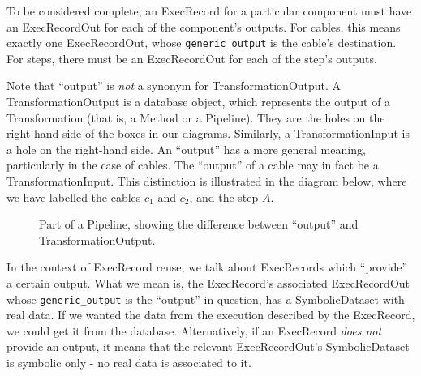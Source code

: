 \documentclass[12pt]{article}
\newcommand{\code}[1]{\texttt{#1}}
\begin{document}
To be considered complete, an ExecRecord for a particular component must have
an ExecRecordOut for each of the component's outputs. For cables, this means
exactly one ExecRecordOut, whose \code{generic\_output} is the cable's
destination. For steps, there must be an ExecRecordOut for each of the step's
outputs.

Note that ``output'' is \emph{not} a synonym for TransformationOutput. A
TransformationOutput is a database object, which represents the output of a
Transformation (that is, a Method or a Pipeline). They are the holes on the
right-hand side of the boxes in our diagrams. Similarly, a TransformationInput
is a hole on the right-hand side. An ``output'' has a more general meaning,
particularly in the case of cables. The ``output'' of a cable may in fact be a
TransformationInput. This distinction is illustrated in the diagram below,
where we have labelled the cables $c_1$ and $c_2$, and the step $A$.

\begin{figure}[ht]
  \centering
  \caption{Part of a Pipeline, showing the difference between ``output'' and TransformationOutput.}
\end{figure}

In the context of ExecRecord reuse, we talk about ExecRecords which ``provide''
a certain output. What we mean is, the ExecRecord's associated ExecRecordOut
whose \code{generic\_output} is the ``output'' in question, has a
SymbolicDataset with real data. If we wanted the data from the execution
described by the ExecRecord, we could get it from the database. Alternatively,
if an ExecRecord \emph{does not} provide an output, it means that the relevant
ExecRecordOut's SymbolicDataset is symbolic only - no real data is associated
to it.
\end{document}
